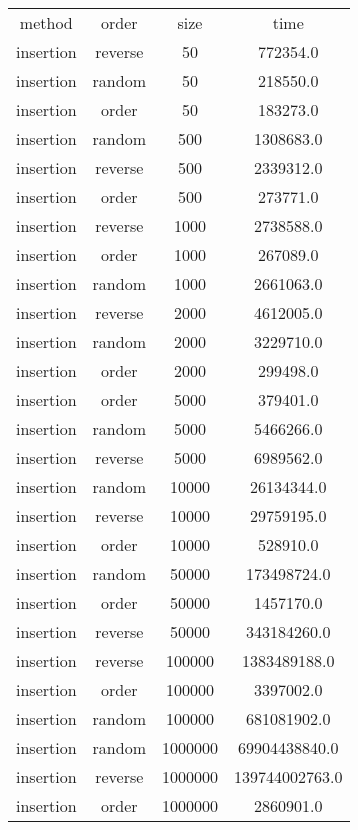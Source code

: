 \begin{table}
\begin{tabular}{cccc}
method & order & size & time \\
insertion & reverse & 50 & 772354.0 \\
insertion & random & 50 & 218550.0 \\
insertion & order & 50 & 183273.0 \\
insertion & random & 500 & 1308683.0 \\
insertion & reverse & 500 & 2339312.0 \\
insertion & order & 500 & 273771.0 \\
insertion & reverse & 1000 & 2738588.0 \\
insertion & order & 1000 & 267089.0 \\
insertion & random & 1000 & 2661063.0 \\
insertion & reverse & 2000 & 4612005.0 \\
insertion & random & 2000 & 3229710.0 \\
insertion & order & 2000 & 299498.0 \\
insertion & order & 5000 & 379401.0 \\
insertion & random & 5000 & 5466266.0 \\
insertion & reverse & 5000 & 6989562.0 \\
insertion & random & 10000 & 26134344.0 \\
insertion & reverse & 10000 & 29759195.0 \\
insertion & order & 10000 & 528910.0 \\
insertion & random & 50000 & 173498724.0 \\
insertion & order & 50000 & 1457170.0 \\
insertion & reverse & 50000 & 343184260.0 \\
insertion & reverse & 100000 & 1383489188.0 \\
insertion & order & 100000 & 3397002.0 \\
insertion & random & 100000 & 681081902.0 \\
insertion & random & 1000000 & 69904438840.0 \\
insertion & reverse & 1000000 & 139744002763.0 \\
insertion & order & 1000000 & 2860901.0 \\
\end{tabular}
\end{table}
